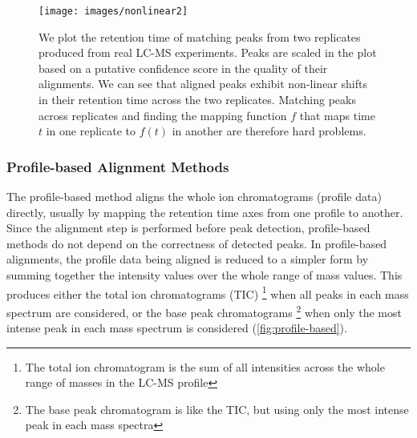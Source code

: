 
\begin{figure}[h]
\noindent \begin{centering}
\texttt{[image: images/nonlinear2]}
\par\end{centering}

\caption{\label{fig:We-plot-the}We plot the retention time of matching peaks from two replicates produced from real LC-MS experiments. Peaks are scaled in the plot based on a putative confidence score in the quality of their alignments. We can see that aligned peaks exhibit non-linear shifts in their retention time across the two replicates. Matching peaks across replicates and finding the mapping function $f$ that maps time $t$ in one replicate to $f(t)$ in another are therefore hard problems.}

\end{figure}

\subsubsection{\label{sub:Profile-based-Alignment-Methods}Profile-based Alignment
Methods}

The profile-based method aligns the whole ion chromatograms (profile data) directly, usually by mapping the retention time axes from one profile to another. Since the alignment step is performed before peak detection, profile-based methods do not depend on the correctness of detected peaks. In profile-based alignments, the profile data being aligned is reduced to a simpler form by summing together the intensity values over the whole range of mass values. This produces either the total ion chromatograms (TIC) \footnote{The total ion chromatogram is the sum of all intensities across the whole range of masses in the LC-MS profile} when all peaks in each mass spectrum are considered, or the base peak chromatograms \footnote{The base peak chromatogram is like the TIC, but using only the most intense peak in each mass spectra} when only the most intense peak in each mass spectrum is considered (\ref{fig:profile-based}).

